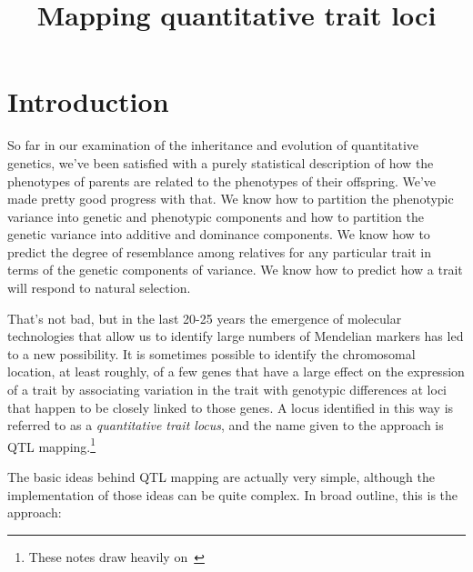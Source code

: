 \documentclass[12pt]{article}
\title{Mapping quantitative trait loci}
\begin{document}
\maketitle

\thispagestyle{first}

\section*{Introduction}

So far in our examination of the inheritance and evolution of
quantitative genetics, we've been satisfied with a purely statistical
description of how the phenotypes of parents are related to the
phenotypes of their offspring. We've made pretty good progress with
that. We know how to partition the phenotypic variance into genetic
and phenotypic components and how to partition the genetic variance
into additive and dominance components. We know how to predict the
degree of resemblance among relatives for any particular trait in
terms of the genetic components of variance. We know how to predict
how a trait will respond to natural selection. 

That's not bad, but in the last 20-25 years the emergence of molecular
technologies that allow us to identify large numbers of Mendelian
markers has led to a new possibility. It is sometimes possible to
identify the chromosomal location, at least roughly, of a few genes
that have a large effect on the expression of a trait by associating
variation in the trait with genotypic differences at loci that happen
to be closely linked to those genes. A locus identified in this way is
referred to as a {\it quantitative trait locus\/}, and the name given
to the approach is QTL mapping.\footnote{These notes draw heavily
  on~\cite{Lynch-Walsh-1998}}

The basic ideas behind QTL mapping are actually very simple, although
the implementation of those ideas can be quite complex. In broad
outline, this is the approach:
\end{document}
